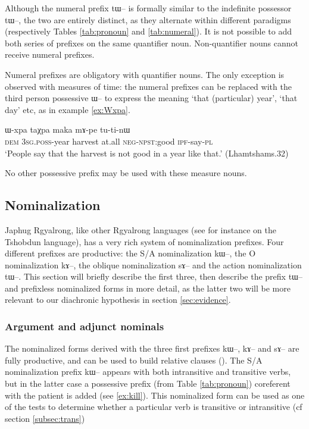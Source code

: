 \documentclass[oldfontcommands,oneside,a4paper,11pt]{article}
\newcommand{\ipa}[1]{{\phon \mbox{#1}}} %
\begin{document}
Although the numeral prefix \ipa{tɯ--} is formally similar to the indefinite possessor \ipa{tɯ--}, the two are entirely distinct, as they alternate within different paradigms (respectively Tables \ref{tab:pronoun} and \ref{tab:numeral}). It is not possible to add both series of prefixes on the same quantifier noun. Non-quantifier nouns cannot receive numeral prefixes.  

Numeral prefixes are obligatory with quantifier nouns. The only exception is observed with measures of time: the numeral prefixes can be replaced  with the third person possessive \ipa{ɯ--} to express the meaning `that (particular) year', `that day' etc, as in  example \ref{ex:Wxpa}. 

\begin{exe}
\ex \label{ex:Wxpa}
\gll \ipa{nɯ}   	\ipa{ɯ-xpa}   	\ipa{taχpa}   	\ipa{maka}   	\ipa{mɤ-pe}   	\ipa{tu-ti-nɯ}    \\
\textsc{dem} 3\textsc{sg.poss}-year harvest at.all \textsc{neg-npst}:good \textsc{ipf}-say-\textsc{pl}\\
\glt `People say that the harvest is not good in a year like that.' (Lhamtshams.32)
\end{exe}

No other possessive prefix may be used with these measure nouns.

\subsection{Nominalization} \label{subsec:nmlz}
Japhug Rgyalrong, like other Rgyalrong languages (see for instance \citealt{jackson03caodeng} on the Tshobdun language), has a very rich system of nominalization prefixes. Four different prefixes are productive: the S/A nominalization \ipa{kɯ--}, the O nominalization \ipa{kɤ--}, the oblique nominalization \ipa{sɤ--}  and the action nominalization \ipa{tɯ--}. This section will briefly describe the first three, then describe the prefix \ipa{tɯ}-- and prefixless nominalized forms in more detail, as the latter two will be more relevant to our diachronic hypothesis in section \ref{sec:evidence}.  

\subsubsection{Argument and adjunct nominals} \label{subsubsec:arg}
The nominalized forms derived with the three first prefixes \ipa{kɯ--}, \ipa{kɤ}-- and \ipa{sɤ}-- are  fully productive, and can be used to build relative clauses (\citealt[464-9]{jacques04these}).  The  S/A nominalization prefix \ipa{kɯ--} appears with both intransitive and transitive verbs, but in the latter case a possessive prefix (from Table \ref{tab:pronoun}) coreferent with the patient is added (see \ref{ex:kill}). This nominalized form can be used as one of the tests to determine whether a particular verb is transitive or intransitive (cf section \ref{subsec:trans})
\end{document}
